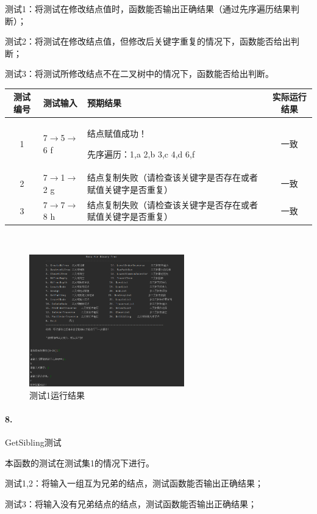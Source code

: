 \documentclass[supercite]{Experimental_Report}
\theoremstyle{definition}
\begin{document}
测试1：将测试在修改结点值时，函数能否输出正确结果（通过先序遍历结果判断）；

测试2：将测试在修改结点值，但修改后关键字重复的情况下，函数能否给出判断；

测试3：将测试所修改结点不在二叉树中的情况下，函数能否给出判断。

\vspace{0.5em}

\begin{tabular}{|c|l|p{6cm}|c|}
	\hline
	测试编号 & 测试输入 & 预期结果 & 实际运行结果 \\
	\hline
	1 & 7$\rightarrow$5$\rightarrow$6 f & 结点赋值成功！

先序遍历：1,a 2,b 3,c 4,d 6,f & 一致 \\
	\hline
	2 & 7$\rightarrow$1$\rightarrow$2 g & 结点复制失败（请检查该关键字是否存在或者赋值关键字是否重复） & 一致 \\
	\hline
	3 & 7$\rightarrow$7$\rightarrow$8 h & 结点复制失败（请检查该关键字是否存在或者赋值关键字是否重复） & 一致 \\
	\hline
\end{tabular}

~\

\begin{figure}[H]
 	\centering
 	\includegraphics[width=0.6\textwidth]{images/二叉树测试7.png}
 	\caption{测试1运行结果}
 	\label{txlab}
 \end{figure}

\paragraph{ 8.}GetSibling测试

本函数的测试在测试集1的情况下进行。

测试1,2：将输入一组互为兄弟的结点，测试函数能否输出正确结果；

测试3：将输入没有兄弟结点的结点，测试函数能否输出正确结果；
\end{document}
